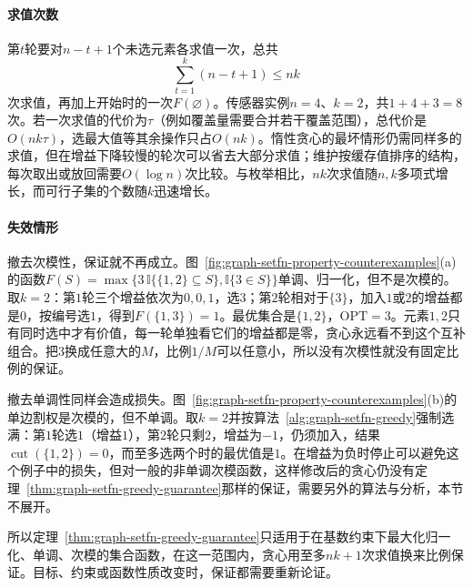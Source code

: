 \paragraph{求值次数}
第$t$轮要对$n-t+1$个未选元素各求值一次，总共
\[
  \sum_{t=1}^{k}(n-t+1)\leq nk
\]
次求值，再加上开始时的一次$F(\varnothing)$。传感器实例$n=4$、$k=2$，共$1+4+3=8$次。若一次求值的代价为$\tau$（例如覆盖量需要合并若干覆盖范围），总代价是$O(nk\tau)$，选最大值等其余操作只占$O(nk)$。惰性贪心的最坏情形仍需同样多的求值，但在增益下降较慢的轮次可以省去大部分求值；维护按缓存值排序的结构，每次取出或放回需要$O(\log n)$次比较。与枚举相比，$nk$次求值随$n,k$多项式增长，而可行子集的个数随$k$迅速增长。

\paragraph{失效情形}
撤去次模性，保证就不再成立。图~\ref{fig:graph-setfn-property-counterexamples}(a)的函数$F(S)=\max\{3\,\mathbb I\{\{1,2\}\subseteq S\},\mathbb I\{3\in S\}\}$单调、归一化，但不是次模的。取$k=2$：第$1$轮三个增益依次为$0,0,1$，选$3$；第$2$轮相对于$\{3\}$，加入$1$或$2$的增益都是$0$，按编号选$1$，得到$F(\{1,3\})=1$。最优集合是$\{1,2\}$，$\mathrm{OPT}=3$。元素$1,2$只有同时选中才有价值，每一轮单独看它们的增益都是零，贪心永远看不到这个互补组合。把$3$换成任意大的$M$，比例$1/M$可以任意小，所以没有次模性就没有固定比例的保证。

撤去单调性同样会造成损失。图~\ref{fig:graph-setfn-property-counterexamples}(b)的单边割权是次模的，但不单调。取$k=2$并按算法~\ref{alg:graph-setfn-greedy}强制选满：第$1$轮选$1$（增益$1$），第$2$轮只剩$2$，增益为$-1$，仍须加入，结果$\operatorname{cut}(\{1,2\})=0$，而至多选两个时的最优值是$1$。在增益为负时停止可以避免这个例子中的损失，但对一般的非单调次模函数，这样修改后的贪心仍没有定理~\ref{thm:graph-setfn-greedy-guarantee}那样的保证，需要另外的算法与分析，本节不展开。

所以定理~\ref{thm:graph-setfn-greedy-guarantee}只适用于在基数约束下最大化归一化、单调、次模的集合函数，在这一范围内，贪心用至多$nk+1$次求值换来比例保证。目标、约束或函数性质改变时，保证都需要重新论证。
